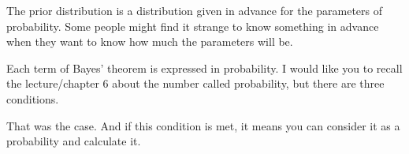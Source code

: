 \documentclass{ltjsarticle}
\begin{document}
The prior distribution is a distribution given in advance for the parameters of probability. Some people might find it strange to know something in advance when they want to know how much the parameters will be.

Each term of Bayes' theorem is expressed in probability. I would like you to recall the lecture/chapter 6 about the number called probability, but there are three conditions.

That was the case. And if this condition is met, it means you can consider it as a probability and calculate it.
\end{document}
